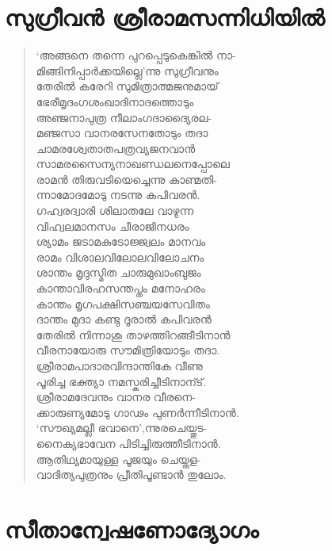 
\section{സുഗ്രീവന്‍ ശ്രീരാമസന്നിധിയില്‍}

\begin{verse}
‘അങ്ങനെ തന്നെ പുറപ്പെടുകെങ്കില്‍ നാ-\\
മിങ്ങിനിപ്പാര്‍ക്കയില്ലെ’ന്നു സുഗ്രീവനും\\
തേരില്‍ കരേറി സുമിത്രാത്മജനുമായ്\\
ഭേരീമൃദംഗശംഖാദിനാദത്തൊടും\\
അഞ്ജനാപുത്ര നീലാംഗദാദ്യൈരല-\\
മഞ്ജസാ വാനരസേനതോടും തദാ\\
ചാമരശ്വേതാതപത്രവ്യജനവാന്‍\\
സാമരസൈന്യനാഖണ്ഡലനെപ്പോലെ\\
രാമന്‍ തിരുവടിയെച്ചെന്നു കാണ്മതി-\\
ന്നാമോദമോടു നടന്നു കപിവരന്‍.\\
ഗഹ്വരദ്വാരി ശിലാതലേ വാഴുന്ന\\
വിഹ്വലമാനസം ചീരാജിനധരം\\
ശ്യാമം ജടാമകുടോജ്ജ്വലം മാനവം\\
രാമം വിശാലവിലോലവിലോചനം\\
ശാന്തം മൃദുസ്മിത ചാരുമുഖാംബുജം\\
കാന്താവിരഹസന്തപ്തം മനോഹരം\\
കാന്തം മൃഗപക്ഷിസഞ്ചയസേവിതം\\
ദാന്തം മുദാ കണ്ടു ദൂരാല്‍ കപിവരന്‍\\
തേരില്‍ നിന്നാശു താഴത്തിറങ്ങീടിനാന്‍\\
വീരനായോരു സൗമിത്രിയോടും തദാ.\\
ശ്രീരാമപാദാരവിന്ദാന്തികേ വീണു\\
പൂരിച്ച ഭക്ത്യാ നമസ്കരിച്ചീടിനാന്ട്.\\
ശ്രീരാമദേവനും വാനര വീരനെ-\\
ക്കാരുണ്യമോടു ഗാഢം പുണര്‍ന്നീടിനാന്‍.\\
‘സൗഖ്യമല്ലീ ഭവാനെ’,ന്നുരചെയ്തുട-\\
നൈക്യഭാവേന പിടിച്ചിരുത്തീടിനാന്‍.\\
ആതിഥ്യമായുള്ള പൂജയും ചെയ്തള-\\
വാദിത്യപുത്രനും പ്രീതിപൂണ്ടാന്‍ തുലോം.
\end{verse}


\section{സീതാന്വേഷണോദ്യോഗം}


